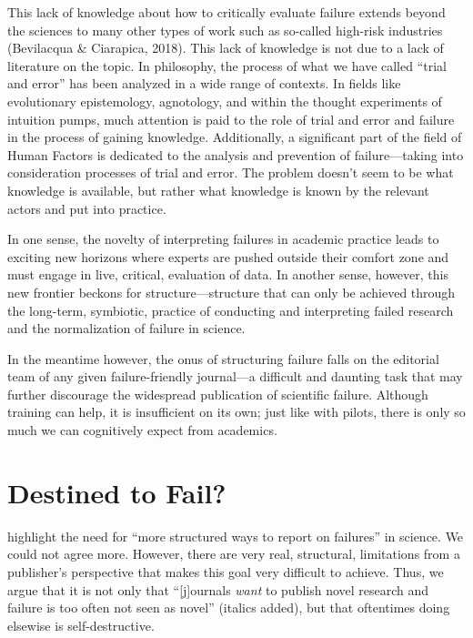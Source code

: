 \documentclass[editorial, authordate,twocolumn,issue]{jote-new-article}
\begin{document}
This lack of knowledge about how to critically evaluate failure extends beyond the sciences to many other types of work such as so-called high-risk industries (Bevilacqua \& Ciarapica, 2018). This lack of knowledge is not due to a lack of literature on the topic. In philosophy, the process of what we have called “trial and error” has been analyzed in a wide range of contexts. In fields like evolutionary epistemology, agnotology, and within the thought experiments of intuition pumps, much attention is paid to the role of trial and error and failure in the process of gaining knowledge. Additionally, a significant part of the field of Human Factors is dedicated to the analysis and prevention of failure—taking into consideration processes of trial and error. The problem doesn't seem to be what knowledge is available, but rather what knowledge is known by the relevant actors and put into practice. 

In one sense, the novelty of interpreting failures in academic practice leads to exciting new horizons where experts are pushed outside their comfort zone and must engage in live, critical, evaluation of data. In another sense, however, this new frontier beckons for structure—structure that can only be achieved through the long-term, symbiotic, practice of conducting and interpreting failed research and the normalization of failure in science.

In the meantime however, the onus of structuring failure falls on the editorial team of any given failure-friendly journal—a difficult and daunting task that may further discourage the widespread publication of scientific failure. Although training can help, it is insufficient on its own; just like with pilots, there is only so much we can cognitively expect from academics. 



\section{Destined to Fail?}

\textcite{Sindall2020} highlight the need for “more structured ways to report on failures” in science. We could not agree more. However, there are very real, structural, limitations from a publisher's perspective that makes this goal very difficult to achieve. Thus, we argue that it is not only that “[j]ournals \emph{want} to publish novel research and failure is too often not seen as novel” (italics added), but that oftentimes doing elsewise is self-destructive. 
\end{document}
